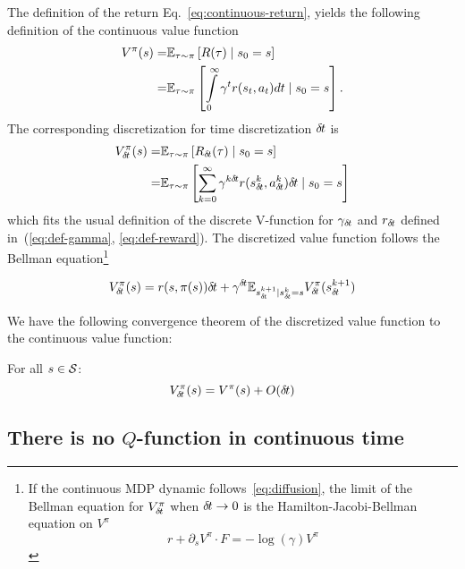 The definition of the return Eq.~\eqref{eq:continuous-return}, yields the
following definition of the continuous value function
\begin{align}
  V^\pi(s) =& \mathbb{E}_{\tau\sim\pi}\left[R(\tau) \mid s_0 = s\right]\\
  =& \mathbb{E}_{\tau\sim\pi}\left[\int\limits_{0}^\infty \gamma^{t} r(s_t, a_t) dt \mid s_0 = s\right].
\end{align}
The corresponding discretization for time discretization ${\delta\hspace{-.1em}t}$ is
\begin{align}
  V^\pi_{\delta\hspace{-.1em}t}(s) =& \mathbb{E}_{\tau\sim\pi}\left[R_{\delta\hspace{-.1em}t}(\tau) \mid s_0 = s\right]\\
  =& \mathbb{E}_{\tau\sim\pi}\left[\sum\limits_{k=0}^\infty \gamma^{k{\delta\hspace{-.1em}t}}r(s^k_{{\delta\hspace{-.1em}t}}, a^k_{{\delta\hspace{-.1em}t}}){\delta\hspace{-.1em}t} \mid s_0 = s\right]
\end{align}
which fits the usual definition of the discrete V-function for $\gamma_{\delta\hspace{-.1em}t}$ and
$r_{\delta\hspace{-.1em}t}$ defined in~(\ref{eq:def-gamma}, \ref{eq:def-reward}).
The discretized value function follows the Bellman equation\footnote{
If the continuous MDP dynamic follows~\eqref{eq:diffusion}, the limit of the Bellman equation for $V^\pi_{\delta\hspace{-.1em}t}$ when ${\delta\hspace{-.1em}t} \rightarrow 0$ is the Hamilton-Jacobi-Bellman equation on $V^\pi$ \cite{cont_rl}
\begin{equation}
  \label{eq:hamilton-jacobi-bellman}
  r + \partial_s V^\pi \cdot F = - \log(\gamma) V^\pi
\end{equation}}

\begin{equation}
  \label{eq:bellman}
  V^\pi_{\delta\hspace{-.1em}t}(s) = {r}(s, \pi(s)){\delta\hspace{-.1em}t} + \gamma^{{\delta\hspace{-.1em}t}} \mathbb{E}_{s_{{\delta\hspace{-.1em}t}}^{k+1} | s_{{\delta\hspace{-.1em}t}}^{k} = s} V^\pi_{\delta\hspace{-.1em}t}(s_{{\delta\hspace{-.1em}t}}^{k+1})
\end{equation}

We have the following convergence theorem of the discretized value function to the continuous value function:
  \begin{theorem}
   For all $s \in {\cal S}$:
    \begin{equation}
      \label{eq:conv-value}
      V^\pi_{\delta\hspace{-.1em}t}(s) = V^\pi(s) + O({\delta\hspace{-.1em}t})
    \end{equation}
    \label{th:conv-value}
  \end{theorem}


\subsection{There is no $Q$-function in continuous time}

